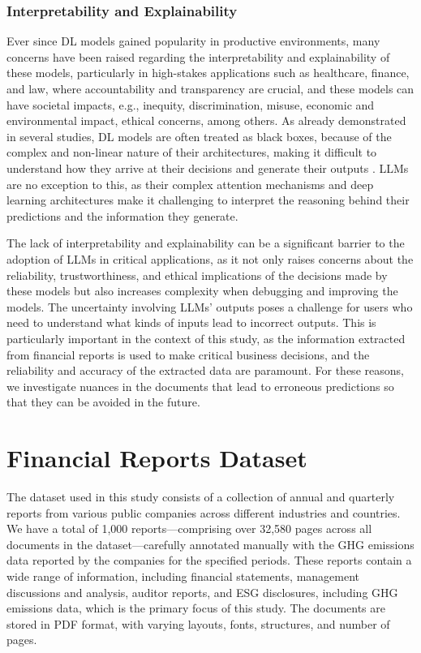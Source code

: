 \documentclass[english, 12pt, a4paper, elec, utf8, a-2b, online]{aaltothesis}
\begin{document}
\subsubsection{Interpretability and Explainability}

Ever since \ac{DL} models gained popularity in productive environments, many concerns have been raised regarding the interpretability and explainability of these models, particularly in high-stakes applications such as healthcare, finance, and law, where accountability and transparency are crucial, and these models can have societal impacts, e.g., inequity, discrimination, misuse, economic and environmental impact, ethical concerns, among others.
As already demonstrated in several studies, \ac{DL} models are often treated as black boxes, because of the complex and non-linear nature of their architectures, making it difficult to understand how they arrive at their decisions and generate their outputs \cite{castelvecchi2016can, 2018_survey_explaining_black_box}.
\ac{LLM}s are no exception to this, as their complex attention mechanisms and deep learning architectures make it challenging to interpret the reasoning behind their predictions and the information they generate.

The lack of interpretability and explainability can be a significant barrier to the adoption of \ac{LLM}s in critical applications, as it not only raises concerns about the reliability, trustworthiness, and ethical implications of the decisions made by these models but also increases complexity when debugging and improving the models.
The uncertainty involving \ac{LLM}s' outputs poses a challenge for users who need to understand what kinds of inputs lead to incorrect outputs.
This is particularly important in the context of this study, as the information extracted from financial reports is used to make critical business decisions, and the reliability and accuracy of the extracted data are paramount.
For these reasons, we investigate nuances in the documents that lead to erroneous predictions so that they can be avoided in the future.

\clearpage

\section{Financial Reports Dataset}
\label{sec:dataset}

The dataset used in this study consists of a collection of annual and quarterly reports from various public companies across different industries and countries.
We have a total of 1,000 reports—comprising over 32,580 pages across all documents in the dataset—carefully annotated manually with the \ac{GHG} emissions data reported by the companies for the specified periods.
These reports contain a wide range of information, including financial statements, management discussions and analysis, auditor reports, and \ac{ESG} disclosures, including \ac{GHG} emissions data, which is the primary focus of this study.
The documents are stored in \ac{PDF} format, with varying layouts, fonts, structures, and number of pages.
\end{document}
